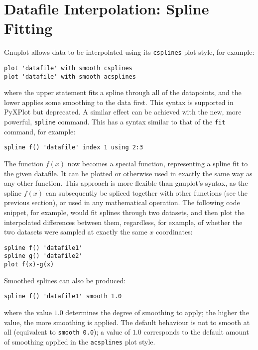 \documentclass[a4paper,onecolumn,11pt]{book}
\begin{document}
\section{Datafile Interpolation: Spline Fitting}
\label{spline_command}

Gnuplot allows data to be interpolated using its \texttt{csplines} plot style,
for example:

\begin{verbatim}
plot 'datafile' with smooth csplines
plot 'datafile' with smooth acsplines
\end{verbatim}

\noindent where the upper statement fits a spline through all of the
datapoints, and the lower applies some smoothing to the data first. This syntax
is supported in PyXPlot but deprecated.  A similar effect can be achieved with
the new, more powerful, \texttt{spline} command. This has a syntax similar to that of the
\texttt{fit} command, for example:

\begin{verbatim}
spline f() 'datafile' index 1 using 2:3
\end{verbatim}

The function $f(x)$ now becomes a special function, representing a spline fit
to the given datafile. It can be plotted or otherwise used in exactly the same
way as any other function. This approach is more flexible than gnuplot's
syntax, as the spline $f(x)$ can subsequently be spliced together with other
functions (see the previous section), or used in any mathematical operation.
The following code snippet, for example, would fit splines through two
datasets, and then plot the interpolated differences between them, regardless,
for example, of whether the two datasets were sampled at exactly the same $x$
coordinates:

\begin{verbatim}
spline f() 'datafile1'
spline g() 'datafile2'
plot f(x)-g(x)
\end{verbatim}

Smoothed splines can also be produced:

\begin{verbatim}
spline f() 'datafile1' smooth 1.0
\end{verbatim}

\noindent where the value $1.0$ determines the degree of smoothing to apply;
the higher the value, the more smoothing is applied. The default behaviour is
not to smooth at all (equivalent to \texttt{smooth 0.0}); a value of $1.0$
corresponds to the default amount of smoothing applied in the
\texttt{acsplines} plot style.
\end{document}
